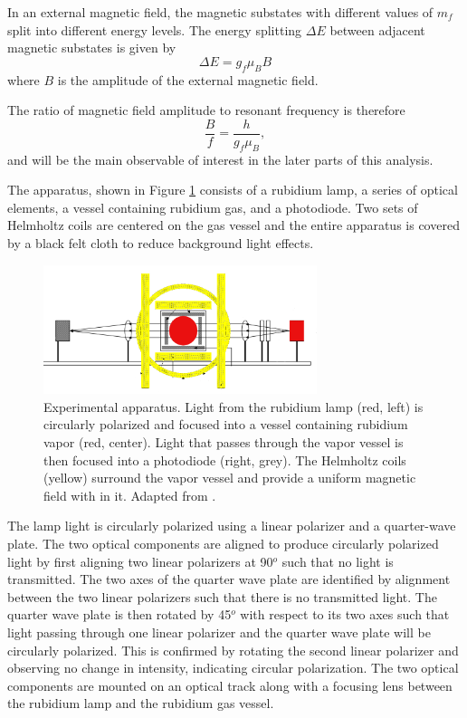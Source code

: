 In an external magnetic field, the magnetic substates with different values of $m_f$ split into different energy levels. The energy splitting $\Delta E$ between adjacent magnetic substates is given by 
\begin{equation}
\Delta E = g_f \mu_B B
\end{equation}
where $B$ is the amplitude of the external magnetic field. 

The ratio of magnetic field amplitude to resonant frequency is therefore
\begin{equation}
\frac{B}{f} = \frac{h}{g_f \mu_B},
\end{equation}
and will be the main observable of interest in the later parts of this analysis.


The apparatus, shown in Figure \ref{app} consists of a rubidium lamp, a series of optical elements, a vessel containing rubidium gas, and a photodiode. Two sets of Helmholtz coils are centered on the gas vessel and the entire apparatus is covered by a black felt cloth to reduce background light effects. 

\begin{figure}[htb]
\includegraphics[width=8cm]{rb_setup.png}
\caption{Experimental apparatus. Light from the rubidium lamp (red, left) is circularly polarized and focused into a vessel containing rubidium vapor (red, center). Light that passes through the vapor vessel is then focused into a photodiode (right, grey). The Helmholtz coils (yellow) surround the vapor vessel and provide a uniform magnetic field with in it. Adapted from \cite{lab}. }
\label{app}
\end{figure}

The lamp light is circularly polarized using a linear polarizer and a quarter-wave plate. The two optical components are aligned to produce circularly polarized light by first aligning two linear polarizers at 90$^{o}$ such that no light is transmitted. The two axes of the quarter wave plate are identified by alignment between the two linear polarizers such that there is no transmitted light. The quarter wave plate is then rotated by 45$^{o}$ with respect to its two axes such that light passing through one linear polarizer and the quarter wave plate will be circularly polarized. This is confirmed by rotating the second linear polarizer and observing no change in intensity, indicating circular polarization. The two optical components are mounted on an optical track along with a focusing lens between the rubidium lamp and the rubidium gas vessel. 

